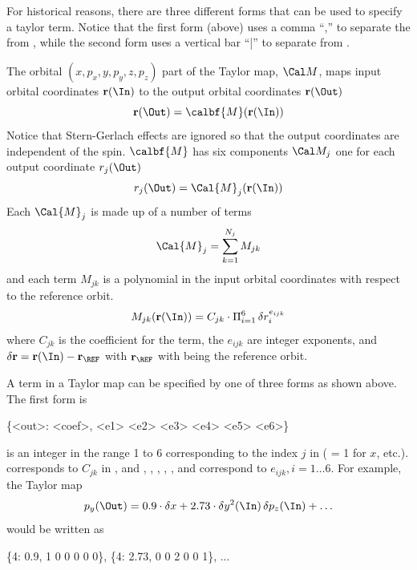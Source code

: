 {For historical reasons, there are three different forms that can be used to specify a
taylor term.  Notice that the first form (above) uses a comma ``,'' to separate the
 from , while the second form uses a vertical bar ``|'' to separate
 from .

The orbital $(x, p_x, y, p_y, z, p_z)$ part of the Taylor map, $\Cal M$, maps input orbital coordinates
$\bfr(\In)$ to the output orbital coordinates $\bfr(\Out)$
\begin{equation}
  \bfr(\Out) = \calbf{M}(\bfr(\In))
  \label{rmr}
\end{equation}
Notice that Stern-Gerlach effects are ignored so that the output coordinates are independent of the
spin. $\calbf{M}$ has six components $\Cal M_j$ one for each output coordinate $r_j(\Out)$
\begin{equation}
  r_j(\Out) = \Cal{M}_j(\bfr(\In))
  \label{rmr2}
\end{equation}
Each $\Cal{M}_j$ is made up of a number of terms
\begin{equation}
  \Cal{M}_j = \sum_{k = 1}^{N_j} M_{jk}
\end{equation}
and each term $M_{jk}$ is a polynomial in the input orbital coordinates with respect to the reference orbit.
\begin{equation}
  M_{jk}(\bfr(\In)) = C_{jk} \cdot \Pi_{i = 1}^6 \, \delta r_i^{e_{ijk}}
  \label{mcpd}
\end{equation}
where $C_{jk}$ is the coefficient for the term, the $e_{ijk}$ are integer exponents, and $\delta
\bfr = \bfr(\In) - \bfr_\REF$ with $\bfr_\REF$ with being the reference orbit.

A term in a Taylor map can be specified by one of three forms as shown above. The first form is
\begin{example}
  \{<out>: <coef>, <e1> <e2> <e3> <e4> <e5> <e6>\}
\end{example}
 is an integer in the range 1 to 6 corresponding to the index $j$ in  (
= 1 for $x$, etc.).  corresponds to $C_{jk}$ in , and , ,
, , , and  correspond to $e_{ijk}, i = 1 \ldots 6$.
For example, the Taylor map 
\begin{equation}
  p_y(\Out) = 0.9 \cdot \delta x + 2.73 \cdot \delta y^2(\In) \, \delta p_z(\In) + \ldots
\end{equation}
would be written as
\begin{example}
  \{4: 0.9, 1 0 0 0 0 0\}, \{4: 2.73, 0 0 2 0 0 1\}, ...
\end{example}

}
